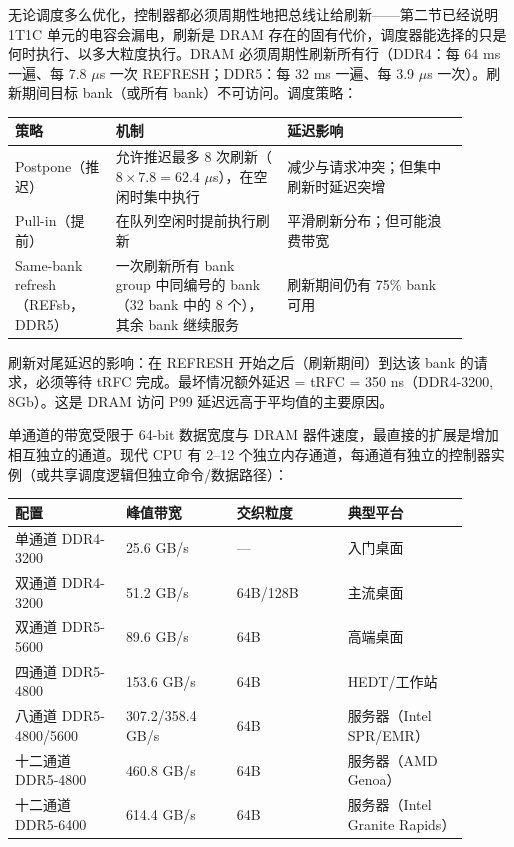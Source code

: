

无论调度多么优化，控制器都必须周期性地把总线让给刷新——第二节已经说明 1T1C 单元的电容会漏电，刷新是 DRAM 存在的固有代价，调度器能选择的只是何时执行、以多大粒度执行。DRAM 必须周期性刷新所有行（DDR4：每 64 ms 一遍、每 7.8 $\mu$s 一次 REFRESH；DDR5：每 32 ms 一遍、每 3.9 $\mu$s 一次）。刷新期间目标 bank（或所有 bank）不可访问。调度策略：

\begin{longtable}{L{0.2\linewidth}L{0.34\linewidth}L{0.36\linewidth}}
\toprule
策略 & 机制 & 延迟影响 \\
\midrule
Postpone（推迟） & 允许推迟最多 8 次刷新（$8 \times 7.8 = 62.4$ $\mu$s），在空闲时集中执行 & 减少与请求冲突；但集中刷新时延迟突增 \\
Pull-in（提前） & 在队列空闲时提前执行刷新 & 平滑刷新分布；但可能浪费带宽 \\
Same-bank refresh（REFsb，DDR5） & 一次刷新所有 bank group 中同编号的 bank（32 bank 中的 8 个），其余 bank 继续服务 & 刷新期间仍有 75\% bank 可用 \\
\bottomrule
\end{longtable}


刷新对尾延迟的影响：在 REFRESH 开始之后（刷新期间）到达该 bank 的请求，必须等待 tRFC 完成。最坏情况额外延迟 = tRFC = 350 ns（DDR4-3200, 8Gb）。这是 DRAM 访问 P99 延迟远高于平均值的主要原因。


单通道的带宽受限于 64-bit 数据宽度与 DRAM 器件速度，最直接的扩展是增加相互独立的通道。现代 CPU 有 2--12 个独立内存通道，每通道有独立的控制器实例（或共享调度逻辑但独立命令/数据路径）：

\begin{longtable}{L{0.22\linewidth}L{0.22\linewidth}L{0.22\linewidth}L{0.24\linewidth}}
\toprule
配置 & 峰值带宽 & 交织粒度 & 典型平台 \\
\midrule
单通道 DDR4-3200 & 25.6 GB/s & — & 入门桌面 \\
双通道 DDR4-3200 & 51.2 GB/s & 64B/128B & 主流桌面 \\
双通道 DDR5-5600 & 89.6 GB/s & 64B & 高端桌面 \\
四通道 DDR5-4800 & 153.6 GB/s & 64B & HEDT/工作站 \\
八通道 DDR5-4800/5600 & 307.2/358.4 GB/s & 64B & 服务器（Intel SPR/EMR） \\
十二通道 DDR5-4800 & 460.8 GB/s & 64B & 服务器（AMD Genoa） \\
十二通道 DDR5-6400 & 614.4 GB/s & 64B & 服务器（Intel Granite Rapids） \\
\bottomrule
\end{longtable}

